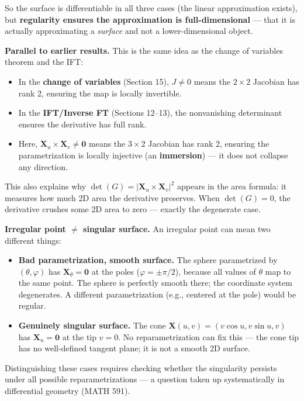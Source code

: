 \documentclass[11pt]{report}
\begin{document}
\begin{remark}
So the surface is differentiable in all three cases (the linear approximation exists), but \textbf{regularity ensures the approximation is full-dimensional} --- that it is actually approximating a \textit{surface} and not a lower-dimensional object.

\textbf{Parallel to earlier results.} This is the same idea as the change of variables theorem and the IFT:
\begin{itemize}
    \item In the \textbf{change of variables} (Section 15), $J \neq 0$ means the $2 \times 2$ Jacobian has rank 2, ensuring the map is locally invertible.
    \item In the \textbf{IFT/Inverse FT} (Sections 12--13), the nonvanishing determinant ensures the derivative has full rank.
    \item Here, $\mathbf{X}_u \times \mathbf{X}_v \neq \mathbf{0}$ means the $3 \times 2$ Jacobian has rank 2, ensuring the parametrization is locally injective (an \textbf{immersion}) --- it does not collapse any direction.
\end{itemize}

This also explains why $\det(G) = |\mathbf{X}_u \times \mathbf{X}_v|^2$ appears in the area formula: it measures how much 2D area the derivative preserves. When $\det(G) = 0$, the derivative crushes some 2D area to zero --- exactly the degenerate case.

\textbf{Irregular point $\neq$ singular surface.} An irregular point can mean two different things:
\begin{itemize}
    \item \textbf{Bad parametrization, smooth surface.} The sphere parametrized by $(\theta, \varphi)$ has $\mathbf{X}_\theta = \mathbf{0}$ at the poles ($\varphi = \pm \pi/2$), because all values of $\theta$ map to the same point. The sphere is perfectly smooth there; the coordinate system degenerates. A different parametrization (e.g., centered at the pole) would be regular.
    \item \textbf{Genuinely singular surface.} The cone $\mathbf{X}(u,v) = (v\cos u, v\sin u, v)$ has $\mathbf{X}_u = \mathbf{0}$ at the tip $v = 0$. No reparametrization can fix this --- the cone tip has no well-defined tangent plane; it is not a smooth 2D surface.
\end{itemize}

Distinguishing these cases requires checking whether the singularity persists under all possible reparametrizations --- a question taken up systematically in differential geometry (MATH 591).
\end{remark}
\end{document}
